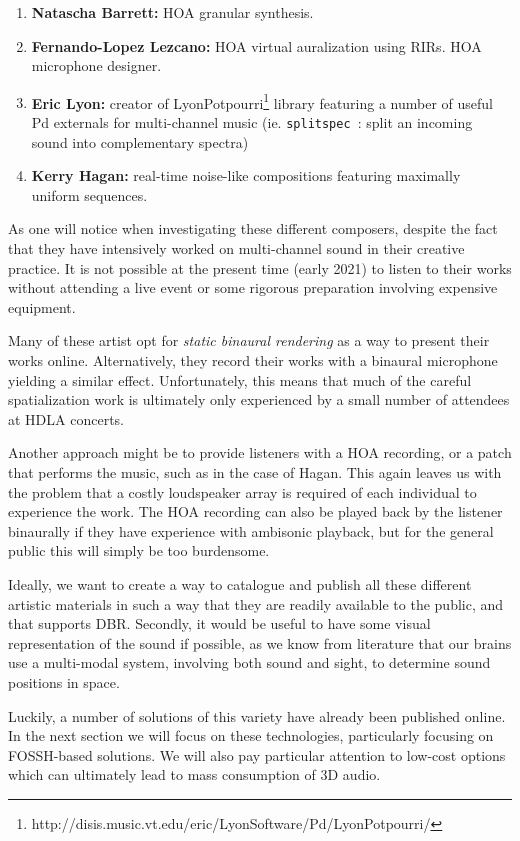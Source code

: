 \begin{enumerate}
    \item \textbf{Natascha Barrett:} HOA granular synthesis.
    \item \textbf{Fernando-Lopez Lezcano:} HOA virtual auralization using RIRs. HOA microphone designer.
    \item \textbf{Eric Lyon:} creator of LyonPotpourri\footnote{http://disis.music.vt.edu/eric/LyonSoftware/Pd/LyonPotpourri/} library featuring a number of useful Pd externals for multi-channel music (ie. \texttt{splitspec~}: split an incoming sound into complementary spectra)
    \item \textbf{Kerry Hagan:} real-time noise-like compositions featuring maximally uniform sequences.
\end{enumerate}

As one will notice when investigating these different composers, despite the fact that they have intensively worked on multi-channel sound in their creative practice. It is not possible at the present time (early 2021) to listen to their works without attending a live event or some rigorous preparation involving expensive equipment. 

Many of these artist opt for \textit{static binaural rendering} as a way to present their works online. Alternatively, they record their works with a binaural microphone yielding a similar effect. Unfortunately, this means that much of the careful spatialization work is ultimately only experienced by a small number of attendees at HDLA concerts.

Another approach might be to provide listeners with a HOA recording, or a patch that performs the music, such as in the case of Hagan. This again leaves us with the problem that a costly loudspeaker array is required of each individual to experience the work. The HOA recording can also be played back by the listener binaurally if they have experience with ambisonic playback, but for the general public this will simply be too burdensome. 

Ideally, we want to create a way to catalogue and publish all these different artistic materials in such a way that they are readily available to the public, and that supports DBR. Secondly, it would be useful to have some visual representation of the sound if possible, as we know from literature that our brains use a multi-modal system, involving both sound and sight, to determine sound positions in space. 

Luckily, a number of solutions of this variety have already been published online. In the next section we will focus on these technologies, particularly focusing on FOSSH-based solutions. We will also pay particular attention to low-cost options which can ultimately lead to mass consumption of 3D audio. 

